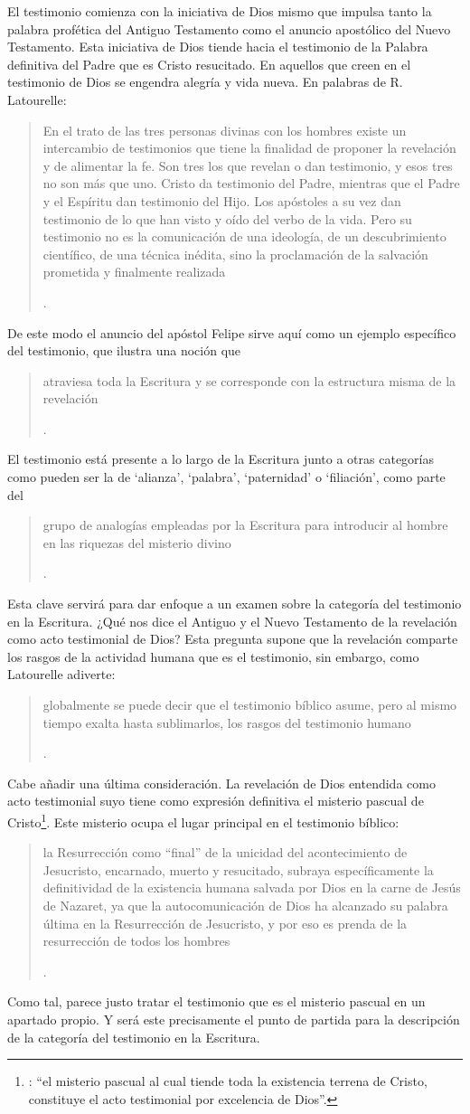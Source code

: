 El testimonio comienza con la iniciativa de Dios mismo que impulsa tanto la palabra profética del Antiguo Testamento como el anuncio apostólico del Nuevo Testamento. Esta iniciativa de Dios tiende hacia el testimonio de la Palabra definitiva del Padre que es Cristo resucitado. En aquellos que creen en el testimonio de Dios se engendra alegría y vida nueva. En palabras de R. Latourelle: \blockquote[{\Cite[1530]{latourelle2000testimonio}}.]{En el trato de las tres personas divinas con los hombres existe un intercambio de testimonios que tiene la finalidad de proponer la revelación y de alimentar la fe. Son tres los que revelan o dan testimonio, y esos tres no son más que uno. Cristo da testimonio del Padre, mientras que el Padre y el Espíritu dan testimonio del Hijo. Los apóstoles a su vez dan testimonio de lo que han visto y oído del verbo de la vida. Pero su testimonio no es la comunicación de una ideología, de un descubrimiento científico, de una técnica inédita, sino la proclamación de la salvación prometida y finalmente realizada}.

De este modo el anuncio del apóstol Felipe sirve aquí como un ejemplo específico del testimonio, que ilustra una noción que \blockquote[{\Cite[109]{prades2015testimonio}}.]{atraviesa toda la Escritura y se corresponde con la estructura misma de la revelación}. El testimonio está presente a lo largo de la Escritura junto a otras categorías como pueden ser la de `alianza', `palabra', `paternidad' o `filiación', como parte del \blockquote[{\Cite[1523]{latourelle2000testimonio}}.]{grupo de analogías empleadas por la Escritura para introducir al hombre en las riquezas del misterio divino}.

Esta clave servirá para dar enfoque a un examen sobre la categoría del testimonio en la Escritura. ¿Qué nos dice el Antiguo y el Nuevo Testamento de la revelación como acto testimonial de Dios? Esta pregunta supone que la revelación comparte los rasgos de la actividad humana que es el testimonio, sin embargo, como Latourelle adiverte: \blockquote[{\Cite[1526]{latourelle2000testimonio}}.]{globalmente se puede decir que el testimonio bíblico asume, pero al mismo tiempo exalta hasta sublimarlos, los rasgos del testimonio humano}.

Cabe añadir una última consideración. La revelación de Dios entendida como acto testimonial suyo tiene como expresión definitiva el misterio pascual de Cristo\footnote{\Cite[128]{prades2015testimonio}: \enquote{el misterio pascual al cual tiende toda la existencia terrena de Cristo, constituye el acto testimonial por excelencia de Dios}.}. Este misterio ocupa el lugar principal en el testimonio bíblico: \blockquote[{\Cite[404]{ninot2009tf}}.]{la Resurrección como ``final'' de la unicidad del acontecimiento de Jesucristo, encarnado, muerto y resucitado, subraya específicamente la definitividad de la existencia humana salvada por Dios en la carne de Jesús de Nazaret, ya que la autocomunicación de Dios ha alcanzado su palabra última en la Resurrección de Jesucristo, y por eso es prenda de la resurrección de todos los hombres}. Como tal, parece justo tratar el testimonio que es el misterio pascual en un apartado propio. Y será este precisamente el punto de partida para la descripción de la categoría del testimonio en la Escritura.

